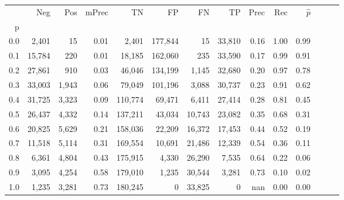 \begin{tabular}{rrrrrrrrrrrrrr}
\toprule
{} &     Neg &    Pos & mPrec &       TN &       FP &      FN &      TP &  Prec &   Rec & $\hat{p}$ \\
p   &         &        &       &          &          &         &         &       &       &           \\
\midrule
0.0 &   2,401 &     15 &  0.01 &    2,401 &  177,844 &      15 &  33,810 &  0.16 &  1.00 &      0.99 \\
0.1 &  15,784 &    220 &  0.01 &   18,185 &  162,060 &     235 &  33,590 &  0.17 &  0.99 &      0.91 \\
0.2 &  27,861 &    910 &  0.03 &   46,046 &  134,199 &   1,145 &  32,680 &  0.20 &  0.97 &      0.78 \\
0.3 &  33,003 &  1,943 &  0.06 &   79,049 &  101,196 &   3,088 &  30,737 &  0.23 &  0.91 &      0.62 \\
0.4 &  31,725 &  3,323 &  0.09 &  110,774 &   69,471 &   6,411 &  27,414 &  0.28 &  0.81 &      0.45 \\
0.5 &  26,437 &  4,332 &  0.14 &  137,211 &   43,034 &  10,743 &  23,082 &  0.35 &  0.68 &      0.31 \\
0.6 &  20,825 &  5,629 &  0.21 &  158,036 &   22,209 &  16,372 &  17,453 &  0.44 &  0.52 &      0.19 \\
0.7 &  11,518 &  5,114 &  0.31 &  169,554 &   10,691 &  21,486 &  12,339 &  0.54 &  0.36 &      0.11 \\
0.8 &   6,361 &  4,804 &  0.43 &  175,915 &    4,330 &  26,290 &   7,535 &  0.64 &  0.22 &      0.06 \\
0.9 &   3,095 &  4,254 &  0.58 &  179,010 &    1,235 &  30,544 &   3,281 &  0.73 &  0.10 &      0.02 \\
1.0 &   1,235 &  3,281 &  0.73 &  180,245 &        0 &  33,825 &       0 &   nan &  0.00 &      0.00 \\
\bottomrule
\end{tabular}

